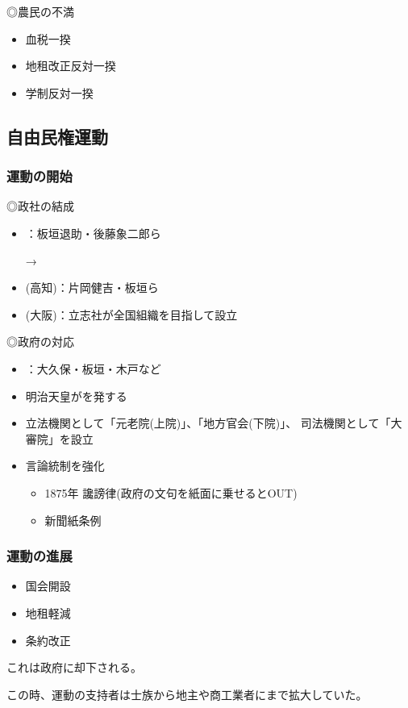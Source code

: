 \documentclass[12pt,fleqn]{ltjsarticle}
\begin{document}
◎農民の不満
\begin{itemize}
\item 血税一揆
\item 地租改正反対一揆
\item 学制反対一揆
\end{itemize}

\subsection{自由民権運動}
\subsubsection{運動の開始}
◎政社の結成
\begin{itemize}
\item {}：板垣退助・後藤象二郎ら

→
\item {}(高知)：片岡健吉・板垣ら
\item {}(大阪)：立志社が全国組織を目指して設立
\end{itemize}
◎政府の対応
\begin{itemize}
\item {}：大久保・板垣・木戸など
\item 明治天皇がを発する
\item 立法機関として「元老院(上院)」、「地方官会(下院)」、
司法機関として「大審院」を設立
\item 言論統制を強化
\begin{itemize}
\item 1875年 讒謗律(政府の文句を紙面に乗せるとOUT)
\item 新聞紙条例
\end{itemize}
\end{itemize}

\subsubsection{運動の進展}
\begin{itemize}
\item 国会開設
\item 地租軽減
\item 条約改正
\end{itemize}
これは政府に却下される。

この時、運動の支持者は士族から地主や商工業者にまで拡大していた。
\end{document}
